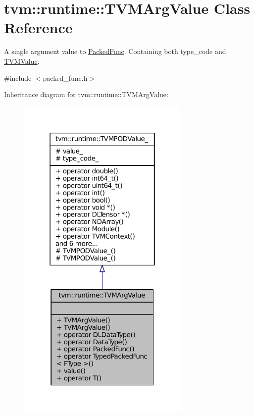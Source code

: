 \hypertarget{classtvm_1_1runtime_1_1TVMArgValue}{}\section{tvm\+:\+:runtime\+:\+:T\+V\+M\+Arg\+Value Class Reference}
\label{classtvm_1_1runtime_1_1TVMArgValue}


A single argument value to \hyperlink{classtvm_1_1runtime_1_1PackedFunc}{Packed\+Func}. Containing both type\+\_\+code and \hyperlink{unionTVMValue}{T\+V\+M\+Value}.  




{\ttfamily \#include $<$packed\+\_\+func.\+h$>$}



Inheritance diagram for tvm\+:\+:runtime\+:\+:T\+V\+M\+Arg\+Value\+:
\nopagebreak
\begin{figure}[H]
\begin{center}
\leavevmode
\includegraphics[width=238pt]{classtvm_1_1runtime_1_1TVMArgValue__inherit__graph}
\end{center}
\end{figure}


